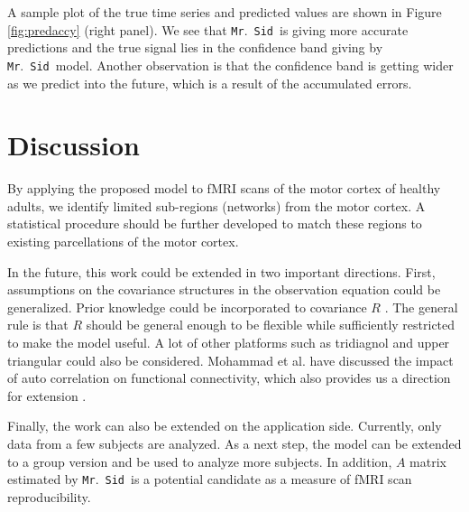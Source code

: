 \documentclass[fleqn,12pt]{article}
\let\oldref\ref
\renewcommand{\ref}[1]{(\oldref{#1})}
\newcommand{\mrsid}{{\sc \texttt{Mr}.~\texttt{Sid}}}
\begin{document}
A sample plot of the true time series and predicted values are shown in Figure \oldref{fig:predaccy} (right panel). We see that \mrsid~is giving more accurate predictions and the true signal lies in the confidence band giving by \mrsid~model. Another observation is that the confidence band is getting wider as we predict into the future, which is a result of the accumulated errors.


\section{Discussion}

By applying the proposed model to fMRI scans of the motor cortex of healthy adults, we identify limited sub-regions (networks) from the motor cortex. A statistical procedure should be further developed to match these regions to existing parcellations of the motor cortex.

In the future, this work could be extended in two important directions. First, assumptions on the covariance structures in the observation equation could be generalized. Prior knowledge could be incorporated to covariance $R$ \citep{allen2014generalized}. The general rule is that $R$ should be general enough to be flexible while sufficiently restricted to make the model useful. A lot of other platforms such as tridiagnol and upper triangular could also be considered. Mohammad et al. have discussed the impact of auto correlation on functional connectivity, which also provides us a direction for extension \citep{arbabshirani2014impact}.

Finally, the work can also be extended on the application side. Currently, only data from a few subjects are analyzed. As a next step, the model can be extended to a group version and be used to analyze more subjects. In addition, $A$ matrix estimated by \mrsid~is a potential candidate as a measure of fMRI scan reproducibility.


%


\end{document}
